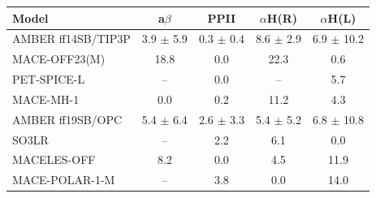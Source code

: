 \begin{tabular}{lcccc}
\hline
Model & a$\beta$ & PPII & $\alpha$H(R) & $\alpha$H(L) \\
\hline
AMBER ff14SB/TIP3P & 3.9 $\pm$ 5.9 & 0.3 $\pm$ 0.4 & 8.6 $\pm$ 2.9 & 6.9 $\pm$ 10.2 \\
MACE-OFF23(M) & 18.8 & 0.0 & 22.3 & 0.6 \\
PET-SPICE-L & -- & 0.0 & -- & 5.7 \\
MACE-MH-1 & 0.0 & 0.2 & 11.2 & 4.3 \\
AMBER ff19SB/OPC & 5.4 $\pm$ 6.4 & 2.6 $\pm$ 3.3 & 5.4 $\pm$ 5.2 & 6.8 $\pm$ 10.8 \\
SO3LR & -- & 2.2 & 6.1 & 0.0 \\
MACELES-OFF & 8.2 & 0.0 & 4.5 & 11.9 \\
MACE-POLAR-1-M & -- & 3.8 & 0.0 & 14.0 \\
\hline
\end{tabular}
